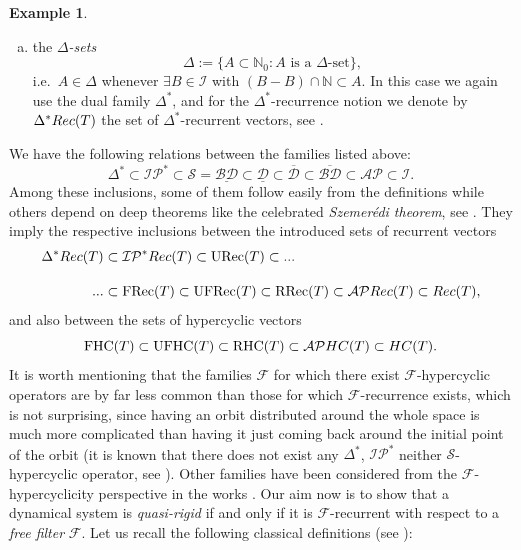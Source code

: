 \documentclass[openright,11pt]{article}
\theoremstyle{plain}
\theoremstyle{definition}
\newtheorem{example}[theorem]{Example}
\newcommand{\NN}{\mathbb{N}}
\newcommand{\AP}{\mathcal{AP}}
\newcommand{\Del}{\Delta}
\newcommand{\Fc}{\mathcal{F}}
\newcommand{\Ic}{\mathcal{I}}
\newcommand{\IP}{\mathcal{IP}}
\newcommand{\Sc}{\mathcal{S}}
\newcommand{\URec}{\operatorname{URec}}
\newcommand{\FRec}{\operatorname{FRec}}
\newcommand{\UFRec}{\operatorname{UFRec}}
\newcommand{\RRec}{\operatorname{RRec}}
\newcommand{\Rec}{\textup{Rec}}
\newcommand{\FHC}{\operatorname{FHC}}
\newcommand{\UFHC}{\operatorname{UFHC}}
\newcommand{\RHC}{\operatorname{RHC}}
\newcommand{\HC}{\textup{HC}}
\newcommand{\BDsup}{\overline{\mathcal{BD}}}
\newcommand{\BDinf}{\underline{\mathcal{BD}}}
\newcommand{\Dsup}{\overline{\mathcal{D}}}
\newcommand{\Dinf}{\underline{\mathcal{D}}}
\begin{document}
\begin{example}
\begin{enumerate}[(a)]
		\item the {\em $\Delta$-sets}
		\[
		\Delta := \{ A \subset \NN_0 : A \text{ is a $\Delta$-set} \},
		\]
		i.e.\ $A \in \Delta$ whenever $\exists B \in \Ic$ with $(B-B)\cap\NN \subset A$. In this case we again use the dual family $\Delta^*$, and for the $\Delta^*$-recurrence notion we denote by $\Delta^*\Rec(T)$ the set of $\Delta^*$-recurrent vectors, see \cite{Furstenberg1981_book,GriLo2023}.
	\end{enumerate}
\end{example}

We have the following relations between the families listed above:
\[
\Del^* \subset \IP^* \subset \Sc = \BDinf \subset \Dinf \subset \Dsup \subset \BDsup \subset \AP \subset \Ic.
\]
Among these inclusions, some of them follow easily from the definitions while others depend on deep theorems like the celebrated {\em Szemer\'edi theorem}, see \cite{BerDown2008,CarMur2022_MS,HS1998,Szemeredi1975}. They imply the respective inclusions between the introduced sets of recurrent vectors
\begin{align*}
	\Del^*\Rec(T) &\subset \IP^*\Rec(T) \subset \URec(T) \subset ...\\[10pt]
	... &\subset \FRec(T) \subset \UFRec(T) \subset \RRec(T) \subset \AP\Rec(T) \subset \Rec(T),
\end{align*}
and also between the sets of hypercyclic vectors
\[
\FHC(T) \subset \UFHC(T) \subset \RHC(T) \subset \AP\HC(T) \subset \HC(T).
\]
It is worth mentioning that the families $\Fc$ for which there exist $\Fc$-hypercyclic operators are by far less common than those for which $\Fc$-recurrence exists, which is not surprising, since having an orbit distributed around the whole space is much more complicated than having it just coming back around the initial point of the orbit (it is known that there does not exist any $\Del^*$, $\IP^*$ neither $\Sc$-hypercyclic operator, see \cite{BMPP2016,BoGrLoPe2022}). Other families have been considered from the $\Fc$-hypercyclicity perspective in the works \cite{BG2018,ErEsMe2021}. Our aim now is to show that a dynamical system is {\em quasi-rigid} if and only if it is $\Fc$-recurrent with respect to a {\em free filter} $\Fc$. Let us recall the following classical definitions (see \cite{Bourbaki1989}):
\end{document}
